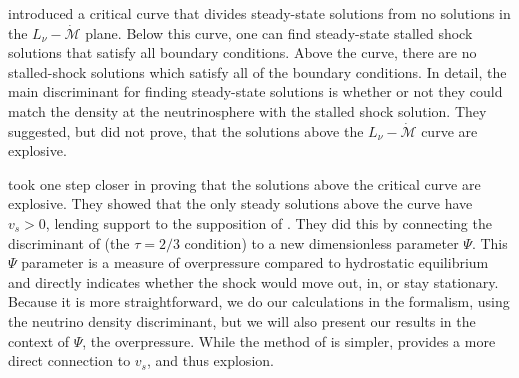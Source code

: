 \documentclass[twocolumn]{aastex6}
\begin{document}
\citet{burrows93} introduced a critical curve
  that divides steady-state solutions from no solutions in the
  $L_\nu-\dot{\mathcal{M}}$ plane.  Below this curve, one can
  find steady-state stalled shock solutions that satisfy all boundary
  conditions.  Above the curve, there are no stalled-shock solutions which satisfy
  all of the boundary conditions. In detail, the main
  discriminant for finding steady-state solutions is whether or not
  they could match the density at the neutrinosphere with the stalled
  shock solution. They suggested, but did  not prove, that the
  solutions above the $L_\nu-\dot{\mathcal{M}}$ curve are explosive. 
  
  \citet{murphy17} took one step closer in proving that the solutions above the
  critical curve are explosive. They showed that the only steady
  solutions above the curve have $v_s > 0$, lending support to the supposition of
  \citet{burrows93}. They did this by connecting the discriminant of
  \citet{burrows93} (the $\tau = 2/3$ condition) to a new dimensionless
  parameter $\Psi$. This $\Psi$ parameter is a measure of overpressure
  compared to hydrostatic equilibrium and directly indicates
    whether the shock would move out, in, or
  stay stationary. Because it is more straightforward, we do our calculations in the \citet{burrows93}
formalism, using the neutrino density discriminant, but we will also present our results in the context of
$\Psi$, the overpressure. While the method of \citet{burrows93} is
simpler, \citet{murphy17} provides a more direct connection to $v_s$, and thus explosion.
  
\end{document}
